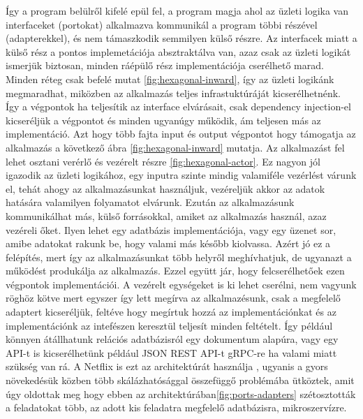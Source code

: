 Így a program belülről kifelé epül fel, a program magja ahol az üzleti logika van interfaceket (portokat) alkalmazva kommunikál a program többi részével (adapterekkel), és nem támaszkodik semmilyen külső részre. Az interfacek miatt a külső rész a pontos implemetációja absztraktálva van, azaz csak az üzleti logikát ismerjük biztosan, minden ráépülő rész implementációja cserélhető marad.
Minden réteg csak befelé mutat \ref{fig:hexagonal-inward}, így az üzleti logikánk megmaradhat, miközben az alkalmazás teljes infrastuktúráját kicserélhetnénk.
Így a végpontok ha teljesítik az interface elvárásait, csak dependency injection-el kicseréljük a végpontot és minden ugyanúgy működik, ám teljesen más az implementáció.
Azt hogy több fajta input és output végpontot hogy  támogatja az alkalmazás a következő ábra \ref{fig:hexagonal-inward} mutatja.
Az alkalmazást fel lehet osztani verérlő és vezérelt részre \ref{fig:hexagonal-actor}. Ez nagyon jól igazodik az üzleti logikához, egy inputra szinte mindig valamiféle vezérlést várunk el,
tehát ahogy az alkalmazásunkat használjuk, vezéreljük akkor az adatok hatására valamilyen folyamatot elvárunk. Ezután az alkalmazásunk kommunikálhat más, külső forrásokkal, amiket az alkalmazás használ, azaz vezéreli őket.
Ilyen lehet egy adatbázis implementációja, vagy egy üzenet sor, amibe adatokat rakunk be, hogy valami más később kiolvassa.
Azért jó ez a felépítés, mert így az alkalmazásunkat több helyről meghívhatjuk, de ugyanazt a működést produkálja az alkalmazás. Ezzel együtt jár, hogy felcserélhetőek ezen végpontok implementációi.
A vezérelt egységeket is ki lehet cserélni, nem vagyunk röghöz kötve mert egyszer így lett megírva az alkalmazésunk, csak a megfelelő adaptert kicseréljük, feltéve hogy megírtuk hozzá az implementációnkat és az implementációnk
az intefészen keresztül teljesít minden feltételt. Így például könnyen átállhatunk relációs adatbázisról egy dokumentum alapúra, vagy egy API-t is kicserélhetünk például JSON REST API-t gRPC-re ha valami miatt szükség van rá.
A Netflix is ezt az architektúrát használja \cite{netflix}, ugyanis a gyors növekedésük közben több skálázhatósággal összefüggő problémába ütköztek, amit úgy oldottak meg hogy
ebben az architektúrában\ref{fig:ports-adapters} szétosztották a feladatokat több, az adott kis feladatra megfelelő adatbázisra, mikroszervízre.

